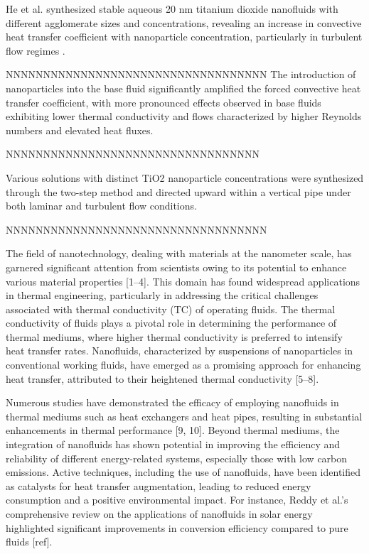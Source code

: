 \documentclass{article}
\begin{document}
He et al. synthesized stable aqueous 20 nm titanium dioxide nanofluids with different agglomerate sizes and concentrations, revealing an increase in convective heat transfer coefficient with nanoparticle concentration, particularly in turbulent flow regimes \cite{ref2}.

NNNNNNNNNNNNNNNNNNNNNNNNNNNNNNNNNNN
The introduction of nanoparticles into the base fluid significantly amplified the forced convective heat transfer coefficient, with more pronounced effects observed in base fluids exhibiting lower thermal conductivity and flows characterized by higher Reynolds numbers and elevated heat fluxes.

NNNNNNNNNNNNNNNNNNNNNNNNNNNNNNNNNN

Various solutions with distinct TiO2 nanoparticle concentrations were synthesized through the two-step method and directed upward within a vertical pipe under both laminar and turbulent flow conditions.

NNNNNNNNNNNNNNNNNNNNNNNNNNNNNNNNNNN

The field of nanotechnology, dealing with materials at the nanometer scale, has garnered significant attention from scientists owing to its potential to enhance various material properties [1–4]. This domain has found widespread applications in thermal engineering, particularly in addressing the critical challenges associated with thermal conductivity (TC) of operating fluids. The thermal conductivity of fluids plays a pivotal role in determining the performance of thermal mediums, where higher thermal conductivity is preferred to intensify heat transfer rates. Nanofluids, characterized by suspensions of nanoparticles in conventional working fluids, have emerged as a promising approach for enhancing heat transfer, attributed to their heightened thermal conductivity [5–8].

Numerous studies have demonstrated the efficacy of employing nanofluids in thermal mediums such as heat exchangers and heat pipes, resulting in substantial enhancements in thermal performance [9, 10]. Beyond thermal mediums, the integration of nanofluids has shown potential in improving the efficiency and reliability of different energy-related systems, especially those with low carbon emissions. Active techniques, including the use of nanofluids, have been identified as catalysts for heat transfer augmentation, leading to reduced energy consumption and a positive environmental impact. For instance, Reddy et al.'s comprehensive review on the applications of nanofluids in solar energy highlighted significant improvements in conversion efficiency compared to pure fluids [ref].
\end{document}
